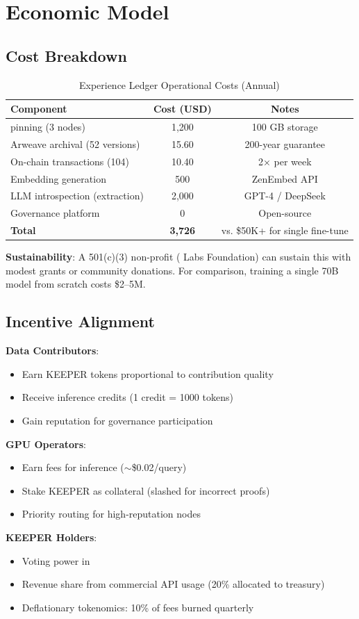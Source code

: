 \section{Economic Model}


\subsection{Cost Breakdown}

\begin{table}[t]
\centering
\caption{Experience Ledger Operational Costs (Annual)}
\label{tab:costs}
\begin{tabular}{lcc}
\toprule
\textbf{Component} & \textbf{Cost (USD)} & \textbf{Notes} \\
\midrule
\IPFS{} pinning (3 nodes) & 1,200 & 100 GB storage \\
Arweave archival (52 versions) & 15.60 & 200-year guarantee \\
On-chain transactions (104) & 10.40 & 2× per week \\
Embedding generation & 500 & ZenEmbed API \\
LLM introspection (extraction) & 2,000 & GPT-4 / DeepSeek \\
Governance platform & 0 & Open-source \\
\midrule
\textbf{Total} & \textbf{3,726} & \multirow{2}{*}{vs. \$50K+ for single fine-tune} \\
\bottomrule
\end{tabular}
\end{table}

\textbf{Sustainability}: A 501(c)(3) non-profit (\Zoo{} Labs Foundation) can sustain this with modest grants or community donations. For comparison, training a single 70B model from scratch costs \$2--5M.

\subsection{Incentive Alignment}

\textbf{Data Contributors}:
\begin{itemize}
    \item Earn KEEPER tokens proportional to contribution quality
    \item Receive inference credits (1 credit = 1000 tokens)
    \item Gain reputation for governance participation
\end{itemize}

\textbf{GPU Operators}:
\begin{itemize}
    \item Earn fees for inference ($\sim$\$0.02/query)
    \item Stake KEEPER as collateral (slashed for incorrect proofs)
    \item Priority routing for high-reputation nodes
\end{itemize}

\textbf{KEEPER Holders}:
\begin{itemize}
    \item Voting power in \DAO{}
    \item Revenue share from commercial API usage (20\% allocated to treasury)
    \item Deflationary tokenomics: 10\% of fees burned quarterly
\end{itemize}

